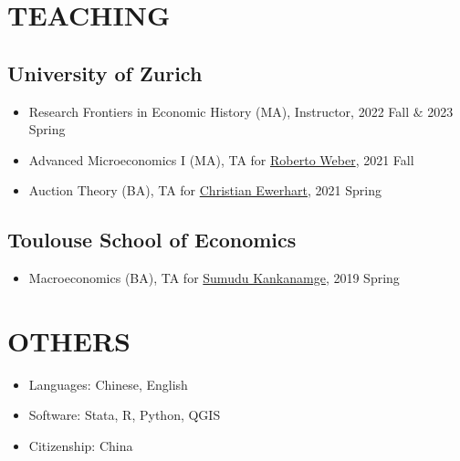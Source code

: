 \documentclass[letterpaper]{article}
\begin{document}
\section*{\MakeUppercase{teaching}}
\subsection*{University of Zurich}
\begin{itemize}
	\item Research Frontiers in Economic History (MA), Instructor, 2022 Fall $\&$ 2023 Spring
    \item Advanced Microeconomics I (MA), TA for \href{https://www.econ.uzh.ch/en/people/faculty/weber.html}{Roberto Weber}, 2021 Fall
    \item Auction Theory (BA), TA for \href{https://www.econ.uzh.ch/en/people/faculty/ewerhart.html}{Christian Ewerhart}, 2021 Spring
\end{itemize}
\subsection*{Toulouse School of Economics}
\begin{itemize}
    \item Macroeconomics  (BA), TA for \href{https://www.tse-fr.eu/people/sumudu-kankanamge}{Sumudu Kankanamge}, 2019 Spring
\end{itemize}

\section*{\MakeUppercase{Others}}
\begin{itemize}
    \item Languages: Chinese, English
    \item Software: Stata, R, Python, QGIS
    \item Citizenship: China
\end{itemize}
\bigskip

\end{document}
